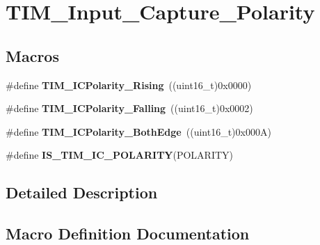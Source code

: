 \hypertarget{group___t_i_m___input___capture___polarity}{}\section{T\+I\+M\+\_\+\+Input\+\_\+\+Capture\+\_\+\+Polarity}
\label{group___t_i_m___input___capture___polarity}
\subsection*{Macros}
\begin{DoxyCompactItemize}
\item 
\hypertarget{group___t_i_m___input___capture___polarity_gabe598596b7dbcac446a4918105fa95a6}{}\#define {\bfseries T\+I\+M\+\_\+\+I\+C\+Polarity\+\_\+\+Rising}~((uint16\+\_\+t)0x0000)\label{group___t_i_m___input___capture___polarity_gabe598596b7dbcac446a4918105fa95a6}

\item 
\hypertarget{group___t_i_m___input___capture___polarity_ga70c6f5ed30a236bac4c690928e742243}{}\#define {\bfseries T\+I\+M\+\_\+\+I\+C\+Polarity\+\_\+\+Falling}~((uint16\+\_\+t)0x0002)\label{group___t_i_m___input___capture___polarity_ga70c6f5ed30a236bac4c690928e742243}

\item 
\hypertarget{group___t_i_m___input___capture___polarity_ga4632a6425d407c0d28b610b2d31cccc8}{}\#define {\bfseries T\+I\+M\+\_\+\+I\+C\+Polarity\+\_\+\+Both\+Edge}~((uint16\+\_\+t)0x000\+A)\label{group___t_i_m___input___capture___polarity_ga4632a6425d407c0d28b610b2d31cccc8}

\item 
\#define {\bfseries I\+S\+\_\+\+T\+I\+M\+\_\+\+I\+C\+\_\+\+P\+O\+L\+A\+R\+I\+T\+Y}(P\+O\+L\+A\+R\+I\+T\+Y)
\end{DoxyCompactItemize}


\subsection{Detailed Description}


\subsection{Macro Definition Documentation}
\hypertarget{group___t_i_m___input___capture___polarity_ga6aff2fe442fd9662a0bb8731134cda89}{}
